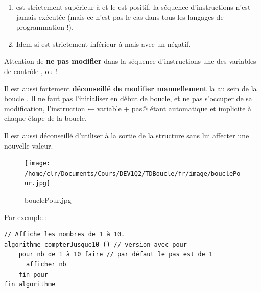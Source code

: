 \documentclass[11pt,a4paper]{article}
\begin{document}
					\begin{enumerate}
				
			\item {} est strictement sup\'erieur \`a \verb@fin@ 
            et le \verb@pas@ est positif, la s\'equence d'instructions n'est
            jamais ex\'ecut\'ee (mais ce n'est pas le cas dans tous les langages de programmation !). 
          
			\item 
            Idem si  est strictement inf\'erieur \`a \verb@fin@ 
            mais avec un \verb@pas@ n\'egatif.
          
					\end{enumerate}
				
            \par
        
        Attention de \textbf{ne pas modifier} dans la s\'equence d'instructions une des variables de contr\^ole
        , \verb@fin@ ou \verb@pas@ ! 
      
            \par
        
        Il est aussi fortement \textbf{d\'econseill\'e de modifier \guillemotleft  manuellement }\guillemotright  
        la \verb@variable@ 
        au sein de la boucle \verb@pour@. 
        Il ne faut pas l'initialiser en d\'ebut de boucle, et ne pas s'occuper de sa modification,
         l'instruction \verb@variable ← variable + pas@ \'etant automatique
        et implicite \`a chaque \'etape de la boucle. 
      
            \par
        
        Il est aussi d\'econseill\'e d'utiliser \verb@variable@ \`a la sortie
        de la structure \verb@pour@ sans lui affecter une nouvelle valeur.
      
            \par
        \begin{figure}[hbt]
				    \begin{center}
					\texttt{[image: /home/clr/Documents/Cours/DEV1Q2/TDBoucle/fr/image/bouclePour.jpg]}
						\end{center}
                
                    \caption[bouclePour.jpg]{bouclePour.jpg}
                \end{figure}
                    
            \par
        Par exemple : 
            \par
        \begin{verbatim}
// Affiche les nombres de 1 à 10.
algorithme compterJusque10 () // version avec pour
    pour nb de 1 à 10 faire // par défaut le pas est de 1
      afficher nb
    fin pour
fin algorithme
    \end{verbatim}
			
\end{document}
